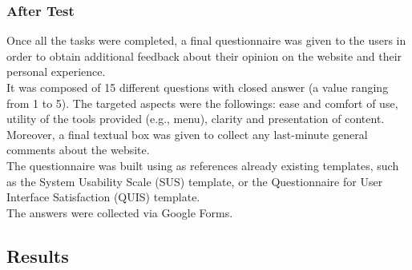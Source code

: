 \documentclass[11pt, letterpaper]{article}
\begin{document}
\subsubsection{After Test}
Once all the tasks were completed, a final questionnaire was given to the users in order to obtain additional feedback about their opinion on the website and their personal experience. \\
It was composed of 15 different questions with closed answer (a value ranging from 1 to 5). The targeted aspects were the followings: ease and comfort of use, utility of the tools provided (e.g., menu), clarity and presentation of content. Moreover, a final textual box was given to collect any last-minute general comments about the website. \\
The questionnaire was built using as references already existing templates, such as the System Usability Scale (SUS) template, or the Questionnaire for User Interface Satisfaction (QUIS) template. \\
The answers were collected via Google Forms. \\

\subsection{Results}
\end{document}
